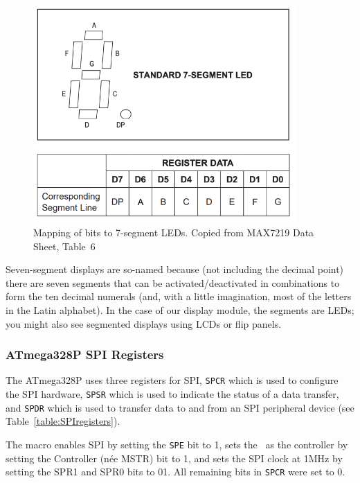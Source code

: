 \begin{figure}
    \centering
    \includegraphics[width=10cm]{SevenSegment}
    \caption{Mapping of bits to 7-segment LEDs. \tiny Copied from MAX7219 Data Sheet, Table~6 \label{fig:SevenSegment}}
\end{figure}

Seven-segment displays are so-named because (not including the decimal point)
there are seven segments that can be activated/deactivated in combinations to
form the ten decimal numerals (and, with a little imagination, most of the
letters in the Latin alphabet). In the case of our display module, the segments
are LEDs; you might also see segmented displays using LCDs or flip panels.

\subsubsection{ATmega328P SPI Registers}

The ATmega328P uses three registers for SPI, \texttt{SPCR} which is used to
configure the SPI hardware, \texttt{SPSR} which is used to indicate the status
of a data transfer, and \texttt{SPDR} which is used to transfer data to and from
an SPI peripheral device (see Table~\ref{table:SPIregisters}).

The  macro enables SPI by setting the \texttt{SPE} bit to
1, sets the \nano\ as the controller by setting the Controller (née MSTR) bit
to 1, and sets the SPI clock at 1MHz by setting the SPR1 and SPR0 bits to 01.
All remaining bits in \texttt{SPCR} were set to 0.

